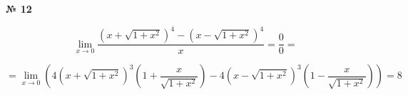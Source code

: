 \documentclass{article}
\begin{document}
\textbf{№ 12} 

$$ \lim\limits_{x\to 0} \frac{\left( x+\sqrt{1+x^2} \right)^4 - \left( x-\sqrt{1+x^2} \right)^4}{x}
= \frac{0}{0}
= $$

$$ = \lim\limits_{x\to 0} \left( 4\left( x+\sqrt{1+x^2} \right)^3\left( 1 + \frac{x}{\sqrt{1+x^2}} \right) - 4\left( x-\sqrt{1+x^2} \right)^3\left( 1 - \frac{x}{\sqrt{1+x^2}} \right) \right)
= 8 $$
\end{document}

